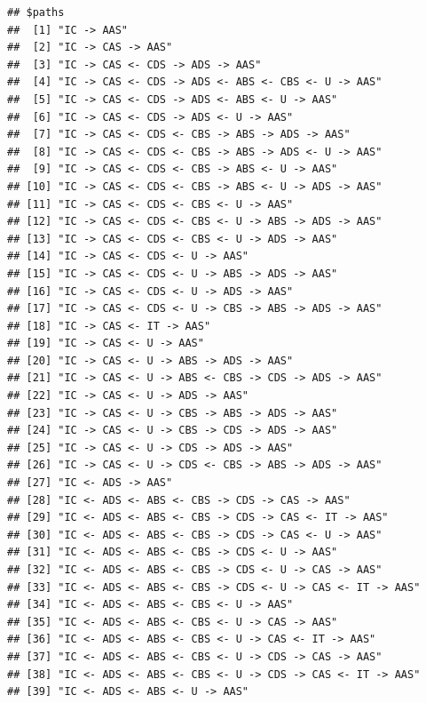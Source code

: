 \documentclass[10pt,dvipsnames,enabledeprecatedfontcommands]{scrartcl}
\begin{document}
\begin{verbatim}
## $paths
##  [1] "IC -> AAS"                                              
##  [2] "IC -> CAS -> AAS"                                       
##  [3] "IC -> CAS <- CDS -> ADS -> AAS"                         
##  [4] "IC -> CAS <- CDS -> ADS <- ABS <- CBS <- U -> AAS"      
##  [5] "IC -> CAS <- CDS -> ADS <- ABS <- U -> AAS"             
##  [6] "IC -> CAS <- CDS -> ADS <- U -> AAS"                    
##  [7] "IC -> CAS <- CDS <- CBS -> ABS -> ADS -> AAS"           
##  [8] "IC -> CAS <- CDS <- CBS -> ABS -> ADS <- U -> AAS"      
##  [9] "IC -> CAS <- CDS <- CBS -> ABS <- U -> AAS"             
## [10] "IC -> CAS <- CDS <- CBS -> ABS <- U -> ADS -> AAS"      
## [11] "IC -> CAS <- CDS <- CBS <- U -> AAS"                    
## [12] "IC -> CAS <- CDS <- CBS <- U -> ABS -> ADS -> AAS"      
## [13] "IC -> CAS <- CDS <- CBS <- U -> ADS -> AAS"             
## [14] "IC -> CAS <- CDS <- U -> AAS"                           
## [15] "IC -> CAS <- CDS <- U -> ABS -> ADS -> AAS"             
## [16] "IC -> CAS <- CDS <- U -> ADS -> AAS"                    
## [17] "IC -> CAS <- CDS <- U -> CBS -> ABS -> ADS -> AAS"      
## [18] "IC -> CAS <- IT -> AAS"                                 
## [19] "IC -> CAS <- U -> AAS"                                  
## [20] "IC -> CAS <- U -> ABS -> ADS -> AAS"                    
## [21] "IC -> CAS <- U -> ABS <- CBS -> CDS -> ADS -> AAS"      
## [22] "IC -> CAS <- U -> ADS -> AAS"                           
## [23] "IC -> CAS <- U -> CBS -> ABS -> ADS -> AAS"             
## [24] "IC -> CAS <- U -> CBS -> CDS -> ADS -> AAS"             
## [25] "IC -> CAS <- U -> CDS -> ADS -> AAS"                    
## [26] "IC -> CAS <- U -> CDS <- CBS -> ABS -> ADS -> AAS"      
## [27] "IC <- ADS -> AAS"                                       
## [28] "IC <- ADS <- ABS <- CBS -> CDS -> CAS -> AAS"           
## [29] "IC <- ADS <- ABS <- CBS -> CDS -> CAS <- IT -> AAS"     
## [30] "IC <- ADS <- ABS <- CBS -> CDS -> CAS <- U -> AAS"      
## [31] "IC <- ADS <- ABS <- CBS -> CDS <- U -> AAS"             
## [32] "IC <- ADS <- ABS <- CBS -> CDS <- U -> CAS -> AAS"      
## [33] "IC <- ADS <- ABS <- CBS -> CDS <- U -> CAS <- IT -> AAS"
## [34] "IC <- ADS <- ABS <- CBS <- U -> AAS"                    
## [35] "IC <- ADS <- ABS <- CBS <- U -> CAS -> AAS"             
## [36] "IC <- ADS <- ABS <- CBS <- U -> CAS <- IT -> AAS"       
## [37] "IC <- ADS <- ABS <- CBS <- U -> CDS -> CAS -> AAS"      
## [38] "IC <- ADS <- ABS <- CBS <- U -> CDS -> CAS <- IT -> AAS"
## [39] "IC <- ADS <- ABS <- U -> AAS"                           

\end{verbatim}
\end{document}
